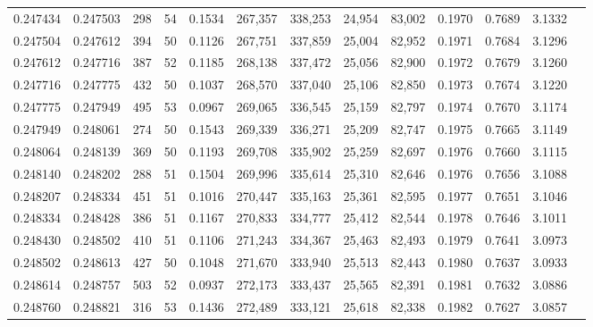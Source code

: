\begin{tabular}{rrrrrrrrrrrrr}
0.247434 & 0.247503 &   298 &  54 &                                     0.1534 & 267,357 & 338,253 &  24,954 &  83,002 & 0.1970 & 0.7689 & 3.1332 \\
0.247504 & 0.247612 &   394 &  50 &                                     0.1126 & 267,751 & 337,859 &  25,004 &  82,952 & 0.1971 & 0.7684 & 3.1296 \\
0.247612 & 0.247716 &   387 &  52 &                                     0.1185 & 268,138 & 337,472 &  25,056 &  82,900 & 0.1972 & 0.7679 & 3.1260 \\
0.247716 & 0.247775 &   432 &  50 &                                     0.1037 & 268,570 & 337,040 &  25,106 &  82,850 & 0.1973 & 0.7674 & 3.1220 \\
0.247775 & 0.247949 &   495 &  53 &                                     0.0967 & 269,065 & 336,545 &  25,159 &  82,797 & 0.1974 & 0.7670 & 3.1174 \\
0.247949 & 0.248061 &   274 &  50 &                                     0.1543 & 269,339 & 336,271 &  25,209 &  82,747 & 0.1975 & 0.7665 & 3.1149 \\
0.248064 & 0.248139 &   369 &  50 &                                     0.1193 & 269,708 & 335,902 &  25,259 &  82,697 & 0.1976 & 0.7660 & 3.1115 \\
0.248140 & 0.248202 &   288 &  51 &                                     0.1504 & 269,996 & 335,614 &  25,310 &  82,646 & 0.1976 & 0.7656 & 3.1088 \\
0.248207 & 0.248334 &   451 &  51 &                                     0.1016 & 270,447 & 335,163 &  25,361 &  82,595 & 0.1977 & 0.7651 & 3.1046 \\
0.248334 & 0.248428 &   386 &  51 &                                     0.1167 & 270,833 & 334,777 &  25,412 &  82,544 & 0.1978 & 0.7646 & 3.1011 \\
0.248430 & 0.248502 &   410 &  51 &                                     0.1106 & 271,243 & 334,367 &  25,463 &  82,493 & 0.1979 & 0.7641 & 3.0973 \\
0.248502 & 0.248613 &   427 &  50 &                                     0.1048 & 271,670 & 333,940 &  25,513 &  82,443 & 0.1980 & 0.7637 & 3.0933 \\
0.248614 & 0.248757 &   503 &  52 &                                     0.0937 & 272,173 & 333,437 &  25,565 &  82,391 & 0.1981 & 0.7632 & 3.0886 \\
0.248760 & 0.248821 &   316 &  53 &                                     0.1436 & 272,489 & 333,121 &  25,618 &  82,338 & 0.1982 & 0.7627 & 3.0857 \\

\end{tabular}
